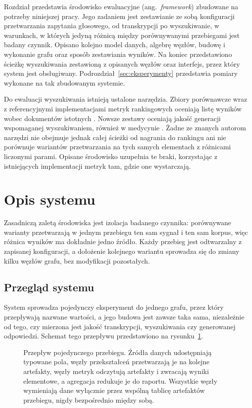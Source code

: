 Rozdział przedstawia środowisko ewaluacyjne (ang.\ \textit{framework}) zbudowane na potrzeby
niniejszej pracy. Jego zadaniem jest zestawianie ze sobą konfiguracji przetwarzania zapytania
głosowego, od transkrypcji po wyszukiwanie, w warunkach, w których jedyną różnicą między
porównywanymi przebiegami jest badany czynnik. Opisano kolejno model danych, algebrę węzłów,
budowę i wykonanie grafu oraz sposób zestawiania wyników. Na koniec przedstawiono ścieżkę
wyszukiwania zestawioną z opisanych węzłów oraz interfejs, przez który system jest obsługiwany.
Podrozdział~\ref{sec:eksperymenty} przedstawia pomiary wykonane na tak zbudowanym systemie.

Do ewaluacji wyszukiwania istnieją ustalone narzędzia. Zbiory porównawcze wraz z referencyjnymi
implementacjami metryk rankingowych oceniają listę wyników wobec dokumentów istotnych
\cite{manning2008introduction, lin2020, thakur2021beir}. Nowsze zestawy oceniają jakość
generacji wspomaganej wyszukiwaniem, również w medycynie \cite{pubmed, es2024ragas}. Żadne ze znanych
autorom narzędzi nie obejmuje jednak całej ścieżki od nagrania do rankingu ani nie porównuje
wariantów przetwarzania na tych samych elementach z różnicami liczonymi parami. Opisane środowisko
uzupełnia te braki, korzystając z istniejących implementacji metryk tam, gdzie one wystarczają.

\section{Opis systemu}
\label{sec:opis}
Zasadniczą zaletą środowiska jest izolacja badanego czynnika: porównywane warianty przetwarzają
w jednym przebiegu ten sam sygnał i ten sam korpus, więc różnica wyników ma dokładnie jedno
źródło. Każdy przebieg jest odtwarzalny z zapisanej konfiguracji, a dołożenie kolejnego wariantu
sprowadza się do zmiany kilku węzłów grafu, bez modyfikacji pozostałych.

\subsection{Przegląd systemu}
\label{sec:przeglad-systemu}
System sprowadza pojedynczy
eksperyment do jednego grafu, przez który przepływają nazwane wartości, a jego budowa jest zawsze
taka sama, niezależnie od tego, czy mierzona jest jakość transkrypcji, wyszukiwania czy generowanej
odpowiedzi. Schemat tego przepływu przedstawiono na rysunku~\ref{fig:przegladSystemu}.

\begin{figure}[htbp]
    \centering
    \caption{Przepływ pojedynczego przebiegu. Źródła danych udostępniają typowane pola, węzły
    przekształceń przetwarzają je na kolejne artefakty, węzły metryk odczytują artefakty i zwracają
    wyniki elementowe, a agregacja redukuje je do raportu. Wszystkie węzły wymieniają dane wyłącznie
    przez wspólną tablicę artefaktów przebiegu, nigdy bezpośrednio między sobą.}
    \label{fig:przegladSystemu}
\end{figure}

